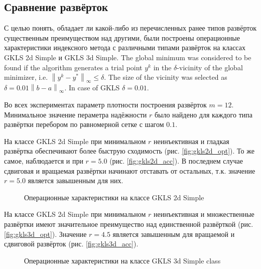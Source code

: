 \subsection{Сравнение развёрток}
\label{sec:seq_comp}
\begin{Russian}
С целью понять, обладает ли какой-либо из перечисленных ранее типов развёрток существенным преимуществом над другими,
были построены операционные характеристики индексного метода с различными типами развёрток на классах
GKLS 2d Simple и GKLS 3d Simple. The global minimum was considered to be found if the algorithm generates a
trial point $y^k$ in the $\delta$-vicinity of the global minimizer, i.e. $\left\|y^k-y^\ast\right\|_\infty\leq\delta$.
The size of the vicinity was selected as $\delta = 0.01\left\|b-a\right\|_\infty$. In case of GKLS $\delta=0.01$.

Во всех экспериментах параметр плотности построения развёрток $m=12$. Минимальное значение пераметра надёжности \(r\) было найдено
для каждого типа развёртки перебором по равномерной сетке с шагом \(0.1\).

На классе GKLS 2d Simple при минимальном \(r\) неинъективная и гладкая развёртка обеспечивают более быструю сходимость
(рис. \ref{fig:gkls2d_opt}). То же самое, наблюдается и при \(r=5.0\) (рис. \ref{fig:gkls2d_acc}). В последнем случае сдвиговая и
вращаемая развёртки начинают отставать от остальных, т.к. значение \(r=5.0\) является завышенным для них.
\begin{figure}[ht]
    \centering
    \caption{Операционные характеристики на классе GKLS 2d Simple}
\end{figure}

На классе GKLS 2d Simple при минимальном \(r\) неинъективная и множественные развёртки имеют значительное
преимущество над единственной развёрткой (рис. \ref{fig:gkls3d_opt}). Значение \(r=4.5\) является завышенным для
вращаемой и сдвиговой развёрток (рис. \ref{fig:gkls3d_acc}).

\begin{figure}[ht]
    \centering
    \caption{Операционные характеристики на классе GKLS 3d Simple class}
\end{figure}


\end{Russian}
